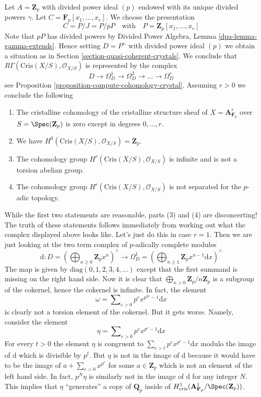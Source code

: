\begin{example}
\label{example-affine-n-space}
Let $A = \mathbf{Z}_p$ with divided power ideal $(p)$ endowed with
its unique divided powers $\gamma$. Let
$C = \mathbf{F}_p[x_1, \ldots, x_r]$. We choose the presentation
$$
C = P/J = P/pP\quad\text{with}\quad P = \mathbf{Z}_p[x_1, \ldots, x_r]
$$
Note that $pP$ has divided powers by
Divided Power Algebra, Lemma \ref{dpa-lemma-gamma-extends}.
Hence setting $D = P^\wedge$ with divided power ideal $(p)$ we obtain a
situation as in Section \ref{section-quasi-coherent-crystals}.
We conclude that $R\Gamma(\text{Cris}(X/S), \mathcal{O}_{X/S})$
is represented by the complex
$$
D \to \Omega^1_D \to \Omega^2_D \to \ldots \to \Omega^r_D
$$
see Proposition \ref{proposition-compute-cohomology-crystal}.
Assuming $r > 0$ we conclude the following
\begin{enumerate}
\item The cristalline cohomology of the cristalline structure sheaf
of $X = \mathbf{A}^r_{\mathbf{F}_p}$ over $S = \Spec(\mathbf{Z}_p)$
is zero except in degrees $0, \ldots, r$.
\item We have $H^0(\text{Cris}(X/S), \mathcal{O}_{X/S}) = \mathbf{Z}_p$.
\item The cohomology group $H^r(\text{Cris}(X/S), \mathcal{O}_{X/S})$
is infinite and is not a torsion abelian group.
\item The cohomology group $H^r(\text{Cris}(X/S), \mathcal{O}_{X/S})$
is not separated for the $p$-adic topology.
\end{enumerate}
While the first two statements are reasonable, parts (3) and (4) are
disconcerting! The truth of these statements follows immediately from
working out what the complex displayed above looks like. Let's just do
this in case $r = 1$. Then we are just looking at the two term complex
of $p$-adically complete modules
$$
\text{d} :
D = \left(
\bigoplus\nolimits_{n \geq 0} \mathbf{Z}_p x^n
\right)^\wedge
\longrightarrow
\Omega^1_D = \left(
\bigoplus\nolimits_{n \geq 1} \mathbf{Z}_p x^{n - 1}\text{d}x
\right)^\wedge
$$
The map is given by $\text{diag}(0, 1, 2, 3, 4, \ldots)$ except that
the first summand is missing on the right hand side. Now it is clear
that $\bigoplus_{n > 0} \mathbf{Z}_p/n\mathbf{Z}_p$ is a subgroup
of the cokernel, hence the cokernel is infinite. In fact, the element
$$
\omega = \sum\nolimits_{e > 0} p^e x^{p^{2e} - 1}\text{d}x
$$
is clearly not a torsion element of the cokernel. But it gets worse.
Namely, consider the element
$$
\eta = \sum\nolimits_{e > 0} p^e x^{p^e - 1}\text{d}x
$$
For every $t > 0$ the element $\eta$ is congruent to
$\sum_{e > t} p^e x^{p^e - 1}\text{d}x$ modulo the image of
$\text{d}$ which is divisible by $p^t$. But $\eta$ is not in the image of
$\text{d}$ because it would have to be the image of
$a + \sum_{e > 0} x^{p^e}$ for some $a \in \mathbf{Z}_p$
which is not an element of the left hand side. In fact, $p^N\eta$
is similarly not in the image of $\text{d}$ for any integer $N$.
This implies that $\eta$ ``generates'' a copy of $\mathbf{Q}_p$ inside
of $H^1_{\text{cris}}(\mathbf{A}_{\mathbf{F}_p}^1/\Spec(\mathbf{Z}_p))$.
\end{example}








